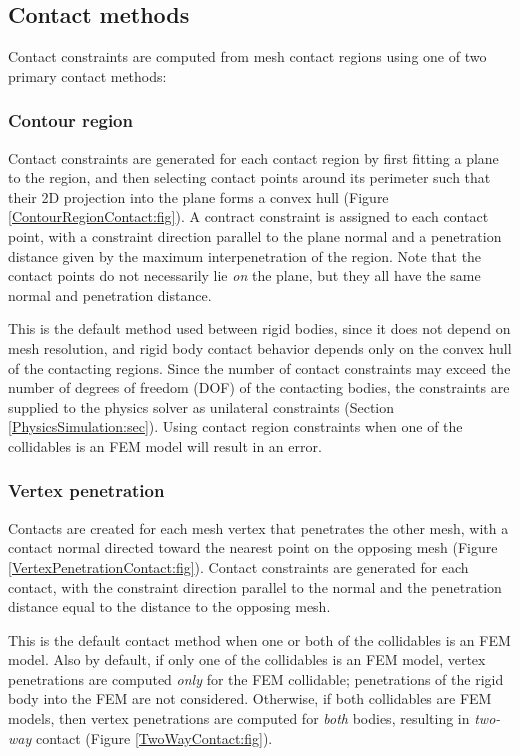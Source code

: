 \subsection{Contact methods}
\label{ContactMethods:sec}

Contact constraints are computed from mesh contact regions using
one of two primary contact methods:

\subsubsection{Contour region}
\label{ContourRegion:sec}

Contact constraints are generated for each contact region by first
fitting a plane to the region, and then selecting contact points
around its perimeter such that their 2D projection into the plane
forms a convex hull (Figure \ref{ContourRegionContact:fig}).  A
contract constraint is assigned to each contact point, with a
constraint direction parallel to the plane normal and a penetration
distance given by the maximum interpenetration of the region. Note
that the contact points do not necessarily lie {\it on} the plane, but
they all have the same normal and penetration distance.

This is the default method used between rigid bodies, since it does
not depend on mesh resolution, and rigid body contact behavior depends
only on the convex hull of the contacting regions. Since the number of
contact constraints may exceed the number of degrees of freedom (DOF)
of the contacting bodies, the constraints are supplied to the physics
solver as unilateral constraints
(Section \ref{PhysicsSimulation:sec}).  Using contact region
constraints when one of the collidables is an FEM model will result in
an error.

\subsubsection{Vertex penetration}
\label{VertexPenetration:sec}

Contacts are created for each mesh vertex that penetrates the other
mesh, with a contact normal directed toward the nearest point on the
opposing mesh (Figure \ref{VertexPenetrationContact:fig}).  Contact
constraints are generated for each contact, with the constraint
direction parallel to the normal and the penetration distance equal to
the distance to the opposing mesh.

This is the default contact method when one or both of the
collidables is an FEM model. Also by default, if only one of the
collidables is an FEM model, vertex penetrations are computed {\it
only} for the FEM collidable; penetrations of the rigid body into the
FEM are not considered. Otherwise, if both collidables are FEM models,
then vertex penetrations are computed for {\it both} bodies, resulting
in {\it two-way} contact (Figure \ref{TwoWayContact:fig}).  

